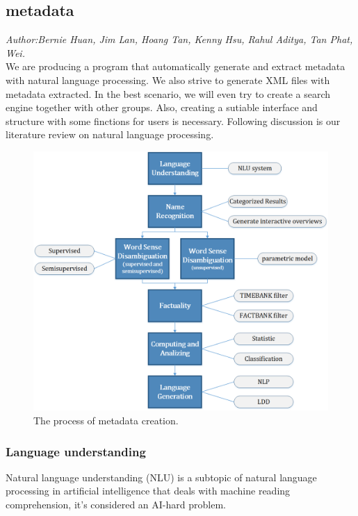 \subsection{metadata}
\textit{\footnotesize Author:Bernie Huan, Jim Lan, Hoang Tan, Kenny Hsu, Rahul Aditya, Tan Phat, Wei.}\\

We are producing a program that automatically generate and extract metadata with natural language processing. 
We also strive to generate XML files with metadata extracted. 
In the best scenario, we will even try to create a search engine together with other groups. 
Also, creating a sutiable interface and structure with some finctions for users is necessary.  
Following discussion is our literature review on natural language processing.

\begin{figure}[ht]
	\begin{center}
		\includegraphics[width=1.8\columnwidth]{Union_Background_Chart_1}
	\end{center}
	\caption{The process of metadata creation.}
\end{figure}


\subsubsection*{Language understanding}
Natural language understanding (NLU) is a subtopic of natural language processing in artificial intelligence that deals with machine reading comprehension, it's considered an AI-hard problem.

